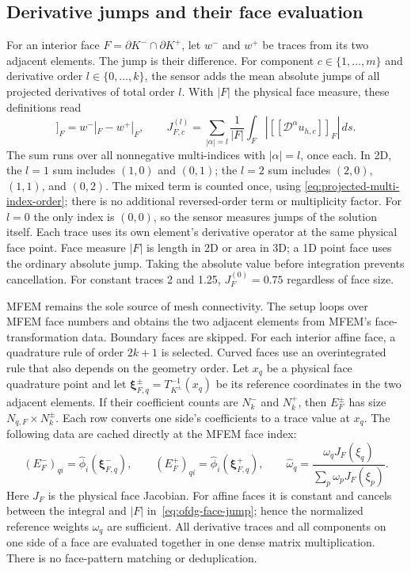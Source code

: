 \subsection{Derivative jumps and their face evaluation}
\label{sec:ofdg-face-evaluation}
For an interior face $F=\partial K^-\cap\partial K^+$, let $w^-$ and
$w^+$ be traces from its two adjacent elements. The jump is their difference.
For component $c\in\{1,\ldots,m\}$ and derivative order
$l\in\{0,\ldots,k\}$, the sensor adds the mean absolute jumps of all
projected derivatives of total order $l$. With $|F|$ the physical face
measure, these definitions read
\begin{equation}
 [\![w]\!]_F=w^-|_F-w^+|_F,
 \qquad
 J_{F,c}^{(l)}=\sum_{|\alpha|=l}\frac1{|F|}\int_F
 \left|[\![\mathscr D^\alpha u_{h,c}]\!]_F\right|\,ds.
 \label{eq:ofdg-face-jump}
\end{equation}
The sum runs over
all nonnegative multi-indices with $|\alpha|=l$, once each. In 2D, the
$l=1$ sum includes $(1,0)$ and $(0,1)$; the $l=2$ sum includes $(2,0)$,
$(1,1)$, and $(0,2)$. The mixed term is counted once, using
\cref{eq:projected-multi-index-order}; there is no additional reversed-order
term or multiplicity factor. For $l=0$ the only index is $(0,0)$, so the
sensor measures jumps of the solution itself. Each trace uses its own
element's derivative operator at the same physical face point. Face measure $|F|$ is
length in 2D or area in 3D; a 1D point face uses the ordinary absolute jump.
Taking the absolute value before integration prevents cancellation. For
constant traces 2 and 1.25, $J_F^{(0)}=0.75$ regardless of face size.


MFEM remains the sole source of mesh connectivity.  The setup loops over MFEM
face numbers and obtains the two adjacent elements from MFEM's face-transformation
data.  Boundary faces are skipped.  For each
interior affine face, a quadrature rule of order $2k+1$ is selected.  Curved
faces use an overintegrated rule that also depends on the geometry order.  Let $x_q$ be a physical face quadrature point and let
$\boldsymbol\xi_{F,q}^{\pm}=T_{K^{\pm}}^{-1}(x_q)$ be its reference
coordinates in the two adjacent elements. If their coefficient counts are
$N_k^-$ and $N_k^+$, then $E_F^\pm$ has size $N_{q,F}\times N_k^\pm$.
Each row converts one side's coefficients to a trace value at $x_q$.
The following data are cached directly at the MFEM face index:
\begin{equation}
  (E_F^-)_{qi}=\widehat\phi_i(\boldsymbol{\xi}_{F,q}^-),
  \qquad
  (E_F^+)_{qi}=\widehat\phi_i(\boldsymbol{\xi}_{F,q}^+),
  \qquad
  \widehat{\omega}_q=\frac{\omega_q J_F(\xi_q)}{\sum_p\omega_p J_F(\xi_p)}.
  \label{eq:ofdg-face-evaluation-matrices}
\end{equation}
Here $J_F$ is the physical face Jacobian.  For affine faces it is constant and cancels between the
integral and $|F|$ in~\eqref{eq:ofdg-face-jump}; hence the normalized reference
weights $\widehat{\omega}_q$ are sufficient.  All derivative traces and all
components on one side of a face are evaluated together in one dense matrix
multiplication.  There is no face-pattern matching or deduplication.

